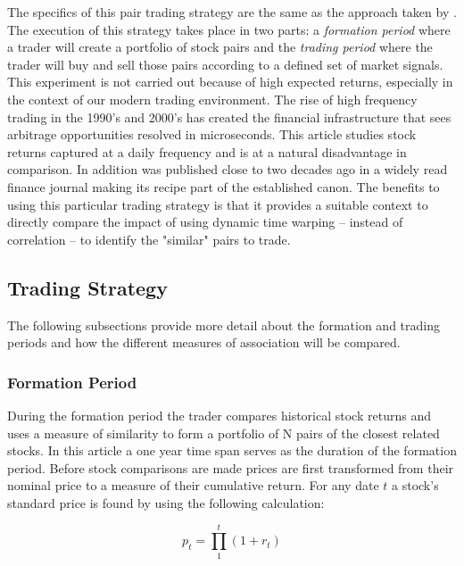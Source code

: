 \documentclass[12pt]{article}
\begin{document}
The specifics of this pair trading strategy are the same as the approach taken by \cite{Gatev_et_al_2006}. The execution of this strategy takes place in two parts: a \textit{formation period} where a trader will create a portfolio of stock pairs and the \textit{trading period} where the trader will buy and sell those pairs according to a defined set of market signals. This experiment is not carried out because of high expected returns, especially in the context of our modern trading environment. The rise of high frequency trading in the 1990's and 2000's has created the financial infrastructure that sees arbitrage opportunities resolved in microseconds\parencite{Aquilina_et_al_2021}. This article studies stock returns captured at a daily frequency and is at a natural disadvantage in comparison. In addition \cite{Gatev_et_al_2006} was published close to two decades ago in a widely read finance journal making its recipe part of the established canon. The benefits to using this particular trading strategy is that it provides a suitable context to directly compare the impact of using dynamic time warping -- instead of correlation -- to identify the "similar" pairs to trade.

\subsection{Trading Strategy}

The following subsections provide more detail about the formation and trading periods and how the different measures of association will be compared.

\subsubsection{Formation Period}

During the formation period the trader compares historical stock returns and uses a measure of similarity to form a portfolio of N pairs of the closest related stocks. In this article a one year time span serves as the duration of the formation period. Before stock comparisons are made prices are first transformed from their nominal price to a measure of their cumulative return. For any date $t$ a stock's standard price is found by using the following calculation:

\begin{equation} \label{eq:standard_price}
    p_{t} = \prod_{1}^{t} (1 + r_{t})
\end{equation}
\end{document}

